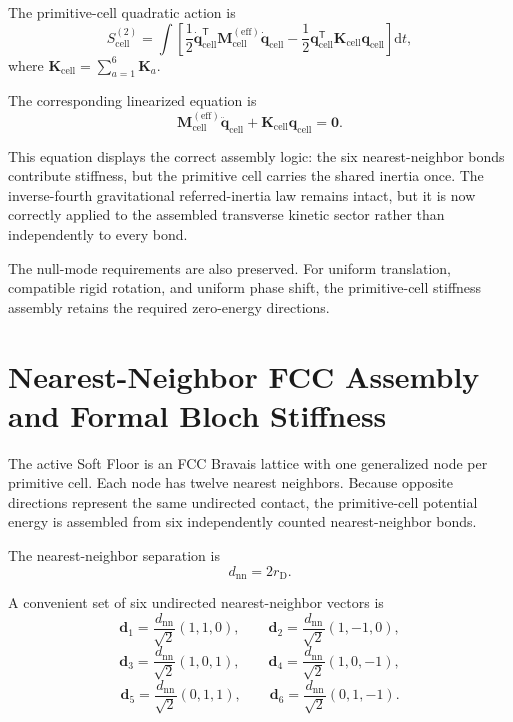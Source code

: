 The primitive-cell quadratic action is
\begin{equation}
    S_{\mathrm{cell}}^{(2)} = \int \left[ \frac{1}{2} \dot{\mathbf{q}}_{\mathrm{cell}}^{\mathsf{T}} \mathbf{M}_{\mathrm{cell}}^{(\mathrm{eff})} \dot{\mathbf{q}}_{\mathrm{cell}} - \frac{1}{2} \mathbf{q}_{\mathrm{cell}}^{\mathsf{T}} \mathbf{K}_{\mathrm{cell}} \mathbf{q}_{\mathrm{cell}} \right] \mathrm{d}t,
\end{equation}
where $\mathbf{K}_{\mathrm{cell}} = \sum_{a=1}^{6} \mathbf{K}_a$.

The corresponding linearized equation is
\begin{equation}
    \mathbf{M}_{\mathrm{cell}}^{(\mathrm{eff})} \ddot{\mathbf{q}}_{\mathrm{cell}} + \mathbf{K}_{\mathrm{cell}} \mathbf{q}_{\mathrm{cell}} = \mathbf{0}.
\end{equation}

This equation displays the correct assembly logic: the six nearest-neighbor bonds contribute stiffness, but the primitive cell carries the shared inertia once. The inverse-fourth gravitational referred-inertia law remains intact, but it is now correctly applied to the assembled transverse kinetic sector rather than independently to every bond.

The null-mode requirements are also preserved. For uniform translation, compatible rigid rotation, and uniform phase shift, the primitive-cell stiffness assembly retains the required zero-energy directions.

\section{Nearest-Neighbor FCC Assembly and Formal Bloch Stiffness}

The active Soft Floor is an FCC Bravais lattice with one generalized node per primitive cell. Each node has twelve nearest neighbors. Because opposite directions represent the same undirected contact, the primitive-cell potential energy is assembled from six independently counted nearest-neighbor bonds.

The nearest-neighbor separation is
\begin{equation}
    d_{\mathrm{nn}} = 2r_{\mathrm{D}}.
\end{equation}

A convenient set of six undirected nearest-neighbor vectors is
\begin{equation}
    \mathbf{d}_1 = \frac{d_{\mathrm{nn}}}{\sqrt{2}}(1,1,0), \qquad \mathbf{d}_2 = \frac{d_{\mathrm{nn}}}{\sqrt{2}}(1,-1,0),
\end{equation}
\begin{equation}
    \mathbf{d}_3 = \frac{d_{\mathrm{nn}}}{\sqrt{2}}(1,0,1), \qquad \mathbf{d}_4 = \frac{d_{\mathrm{nn}}}{\sqrt{2}}(1,0,-1),
\end{equation}
\begin{equation}
    \mathbf{d}_5 = \frac{d_{\mathrm{nn}}}{\sqrt{2}}(0,1,1), \qquad \mathbf{d}_6 = \frac{d_{\mathrm{nn}}}{\sqrt{2}}(0,1,-1).
\end{equation}

